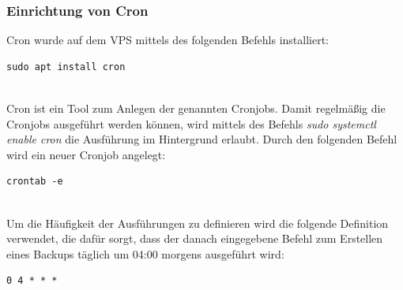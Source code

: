\subsubsection{Einrichtung von Cron}
Cron wurde auf dem VPS mittels des folgenden Befehls installiert: 
~\\\begin{lstlisting}[caption={Befehl zum Installieren von cron}, captionpos=b, 
    label={fig:Cron Installation}]
    sudo apt install cron
\end{lstlisting}
~\\ Cron ist ein Tool zum Anlegen der genannten Cronjobs. Damit regelmäßig die 
Cronjobs ausgeführt werden können, wird mittels des Befehls \textit{sudo systemctl enable cron} 
die Ausführung im Hintergrund erlaubt. Durch den folgenden Befehl wird ein neuer Cronjob angelegt: 
~\\\begin{lstlisting}[caption={Befehl zum Erstellen eines neuen Cronjobs}, captionpos=b, 
    label={fig:CronJob Creation}]
    crontab -e
\end{lstlisting}
~\\ Um die Häufigkeit der Ausführungen zu definieren wird die folgende Definition verwendet, die 
dafür sorgt, dass der danach eingegebene Befehl zum Erstellen eines Backups täglich um 04:00
morgens ausgeführt wird: 
~\\\begin{lstlisting}[caption={Definition des Ausführungsintervalls}, captionpos=b, 
    label={fig:CronJob Definition}]
    0 4 * * *
\end{lstlisting}